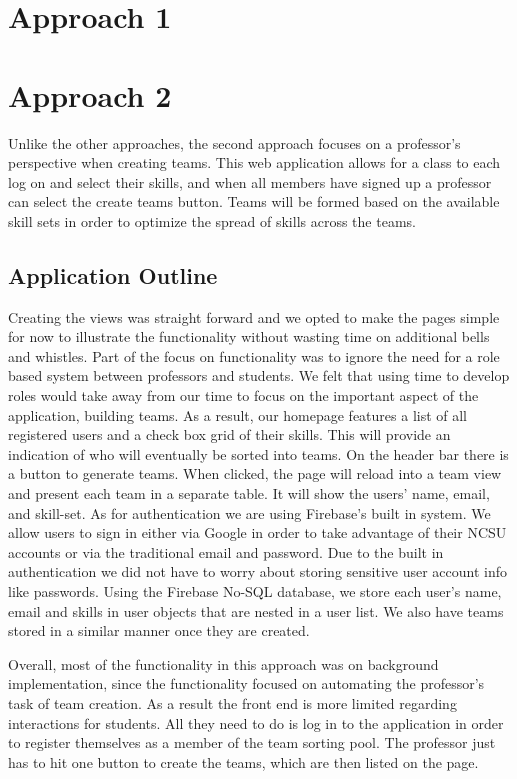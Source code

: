 \documentclass[conference]{IEEEtran}
\begin{document}
\section{Approach 1}
\blindtext

\section{Approach 2}
Unlike the other approaches, the second approach focuses on a professor's perspective when creating teams. This web application allows for a class to each log on and select their skills, and when all members have signed up a professor can select the create teams button. Teams will be formed based on the available skill sets in order to optimize the spread of skills across the teams. 

\subsection{Application Outline}
Creating the views was straight forward and we opted to make the pages simple for now to illustrate the functionality without wasting time on additional bells and whistles. Part of the focus on functionality was to ignore the need for a role based system between professors and students. We felt that using time to develop roles would take away from our time to focus on the important aspect of the application, building teams. As a result, our homepage features a list of all registered users and a check box grid of their skills. This will provide an indication of who will eventually be sorted into teams. On the header bar there is a button to generate teams. When clicked, the page will reload into a team view and present each team in a separate table. It will show the users' name, email, and skill-set. As for authentication we are using Firebase's built in system. We allow users to sign in either via Google in order to take advantage of their NCSU accounts or via the traditional email and password. Due to the built in authentication we did not have to worry about storing sensitive user account info like passwords. Using the Firebase No-SQL database, we store each user's name, email and skills in user objects that are nested in a user list. We also have teams stored in a similar manner once they are created. 

Overall, most of the functionality in this approach was on background implementation, since the functionality focused on automating the professor's task of team creation. As a result the front end is more limited regarding interactions for students. All they need to do is log in to the application in order to register themselves as a member of the team sorting pool. The professor just has to hit one button to create the teams, which are then listed on the page.
\end{document}
